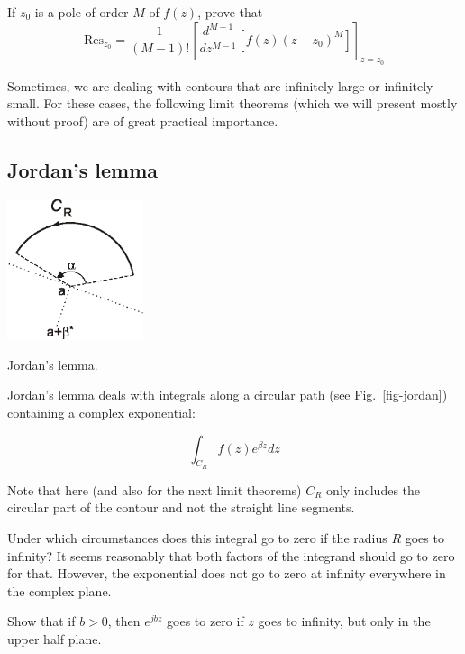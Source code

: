 \begin{exer}
If $z_0$ is a pole of order $M$ of $f(z)$, prove that
$$\mathrm{Res}_{z_0} = \frac{1}{(M-1)!}{\left[\frac{d^{M-1}}{dz^{M-1}}[f(z)(z-z_0)^M]\right]}_{z=z_0}$$
\end{exer}


\pagebreak


\label{week2}

Sometimes, we are dealing with contours that are infinitely large or infinitely small. For these cases, the following limit theorems (which we will present mostly without proof) are of great practical importance.

\subsection*{Jordan's lemma}

\begin{marginfigure}
\centering
\includegraphics[width=4cm]{complex/figures/jordan}
\caption{Jordan's lemma.}
\label{fig-jordan}
\end{marginfigure}

Jordan's lemma deals with integrals along a circular path  (see Fig.~\ref{fig-jordan}) containing a complex exponential: 

$$ \int_{{C}_R} f(z) e^{\beta z} dz$$

Note that here (and also for the next limit theorems) ${{C}_R}$ only includes the circular part of the contour and not the straight line segments.

Under which circumstances does this integral go to zero if the radius $R$ goes to infinity? It seems reasonably that both factors of the integrand should go to zero for that. However, the exponential does not go to zero at infinity everywhere in the complex plane. 

\begin{cue}
Show that if $b>0$, then $e^{jbz}$ goes to zero if $z$ goes to infinity, but only in the upper half plane.
\end{cue}


